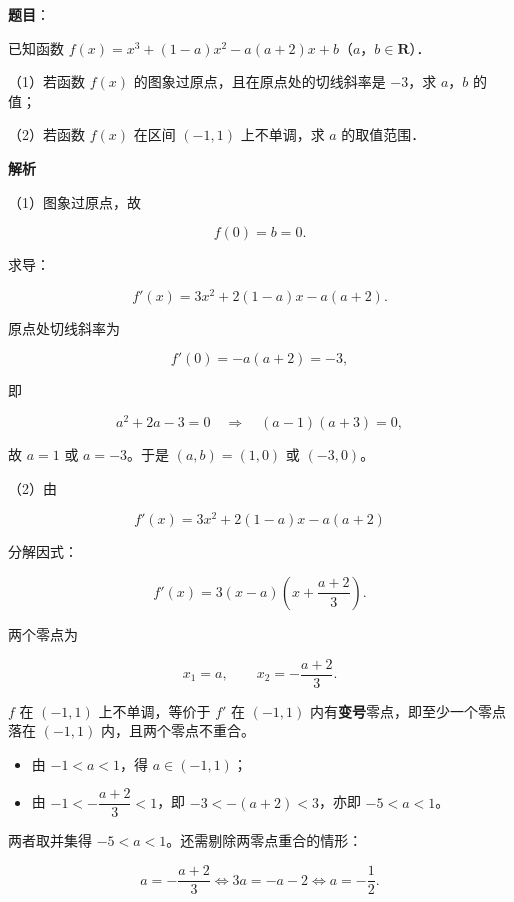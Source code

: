 \begin{answer}

\textbf{题目}：

已知函数 $f(x)=x^3+(1-a)x^2-a(a+2)x+b$（$a$，$b\in\mathbf R$）．

（1）若函数 $f(x)$ 的图象过原点，且在原点处的切线斜率是 $-3$，求 $a$，$b$ 的值；

（2）若函数 $f(x)$ 在区间 $(-1,1)$ 上不单调，求 $a$ 的取值范围．

\textbf{解析}

（1）图象过原点，故

\nopagebreak[4]
\[f(0)=b=0.\]

求导：

\nopagebreak[4]
\[f'(x)=3x^2+2(1-a)x-a(a+2).\]

原点处切线斜率为

\nopagebreak[4]
\[f'(0)=-a(a+2)=-3,\]

即

\nopagebreak[4]
\[a^2+2a-3=0\quad\Longrightarrow\quad(a-1)(a+3)=0,\]

故 $a=1$ 或 $a=-3$。于是 $(a,b)=(1,0)$ 或 $(-3,0)$。

（2）由

\nopagebreak[4]
\[f'(x)=3x^2+2(1-a)x-a(a+2)\]

分解因式：

\nopagebreak[4]
\[f'(x)=3\left(x-a\right)\left(x+\frac{a+2}{3}\right).\]

两个零点为

\nopagebreak[4]
\[x_1=a,\qquad x_2=-\frac{a+2}{3}.\]

$f$ 在 $(-1,1)$ 上不单调，等价于 $f'$ 在 $(-1,1)$ 内有\textbf{变号}零点，即至少一个零点落在 $(-1,1)$ 内，且两个零点不重合。

\begin{itemize}
\item 由 $-1<a<1$，得 $a\in(-1,1)$；
\item 由 $-1<-\dfrac{a+2}{3}<1$，即 $-3<-(a+2)<3$，亦即 $-5<a<1$。
\end{itemize}

两者取并集得 $-5<a<1$。还需剔除两零点重合的情形：

\nopagebreak[4]
\[a=-\frac{a+2}{3}\iff 3a=-a-2\iff a=-\frac12 .\]


\end{answer}
